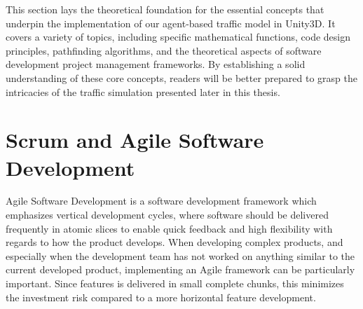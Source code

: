 
This section lays the theoretical foundation for the essential concepts that underpin the implementation of our agent-based traffic model in Unity3D. It covers a variety of topics, including specific mathematical functions, code design principles, pathfinding algorithms, and the theoretical aspects of software development project management frameworks. By establishing a solid understanding of these core concepts, readers will be better prepared to grasp the intricacies of the traffic simulation presented later in this thesis.









\section{Scrum and Agile Software Development}
    Agile Software Development is a software development framework which emphasizes vertical development cycles, where software should be delivered frequently in atomic slices to enable quick feedback and high flexibility with regards to how the product develops. When developing complex products, and especially when the development team has not worked on anything similar to the current developed product, implementing an Agile framework can be particularly important. Since features is delivered in small complete chunks, this minimizes the investment risk compared to a more horizontal feature development. 






